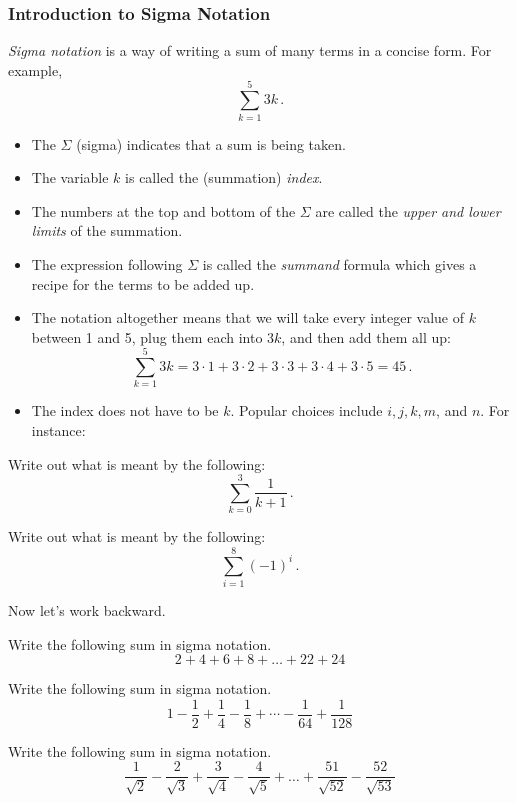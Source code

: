 \documentclass[10pt,t,handout,ignorenonframetext,aspectratio=169]{beamer}
\title[\course]{\lecTitle}
\institute[Ohio State]
{
  \medskip
}
\date[\week]{\semester}
\author{Tae Eun Kim, Ph.D.}
\begin{document}
\begin{frame}
  \titlepage
\end{frame}


\begin{frame}
  \frametitle{Introduction to Sigma Notation}
  \begingroup
  \small
  \textit{Sigma notation} is a way of writing a sum of many terms in a
  concise form. For example,
  \[
    \sum_{k=1}^{5} 3k \,.
  \]
  \begin{itemize}
  \item The $\Sigma$ (sigma) indicates that a sum is being taken.
  \item The variable $k$ is called the (summation) \textit{index}.
  \item The numbers at the top and bottom of the $\Sigma$ are called the
    \textit{upper and lower limits} of the summation.
  \item The expression following $\Sigma$ is called the \textit{summand} formula
    which gives a recipe for the terms to be added up.
  \item The notation altogether means that we will take every integer
    value of $k$ between 1 and 5, plug them each into $3k$, and then
    add them all up:
    \[
      \sum_{k=1}^{5} 3k = 3\cdot 1 + 3\cdot 2 + 3\cdot 3 + 3\cdot 4 + 3\cdot 5 = 45 \,.
    \]
  \item The index does not have to be $k$. Popular choices include
    $i, j, k, m$, and $n$. For instance:
  \end{itemize}
  \endgroup
\end{frame}

\begin{frame}
  \vs
  \begin{question}
    Write out what is meant by the following:
    \[
      \sum_{k=0}^{3} \frac{1}{k+1} \,.
    \]
  \end{question}
  \vfill
  \begin{question}
    Write out what is meant by the following:
    \[
      \sum_{i=1}^{8} \left(-1\right)^i \,.
    \]
  \end{question}
\end{frame}

\begin{frame}
  \vs
  \begingroup
  \small
  Now let's work backward.

  \vs
  \begin{question}
    Write the following sum in sigma notation.
    \[
      2 + 4 + 6 + 8 + \ldots + 22 + 24
    \]
  \end{question}
  \vfill
  \begin{question}
    Write the following sum in sigma notation.
    \[
      1 - \frac{1}{2} + \frac{1}{4} - \frac{1}{8} +
      \cdots - \frac{1}{64} + \frac{1}{128}
    \]
  \end{question}
  \vfill
  \begin{question}
    Write the following sum in sigma notation.
    \[
      \frac{1}{\sqrt{2}} - \frac{2}{\sqrt{3}} + \frac{3}{\sqrt{4}} -
      \frac{4}{\sqrt{5}}+ \ldots + \frac{51}{\sqrt{52}} -
      \frac{52}{\sqrt{53}}
    \]
  \end{question}
  \vfill
  \endgroup
\end{frame}
\end{document}
